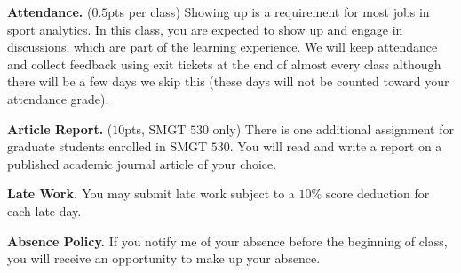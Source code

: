\documentclass[11pt]{article}
\begin{document}
\begin{adjustwidth}{1cm}{0cm}
  \textbf{Attendance.} ($0.5$pts per class) Showing up is a requirement for most jobs in sport analytics. In this class, you are expected to show up and engage in discussions, which are part of the learning experience. We will keep attendance and collect feedback using exit tickets at the end of almost every class although there will be a few days we skip this (these days will not be counted toward your attendance grade).

  \textbf{Article Report.} ($10$pts, SMGT $530$ only) There is one additional assignment for graduate students enrolled in SMGT $530$. You will read and write a report on a published academic journal article of your choice.

  \textbf{Late Work.} You may submit late work subject to a $10\%$ score deduction for each late day.

  \textbf{Absence Policy.} If you notify me of your absence before the beginning of class, you will receive an opportunity to make up your absence.
\end{adjustwidth}
\end{document}
